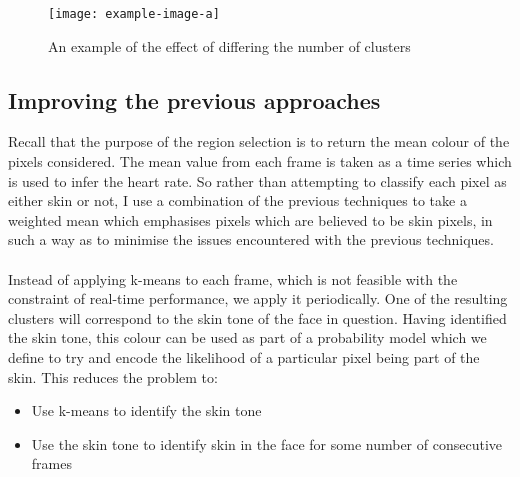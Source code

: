 \begin{figure}[H]
    \texttt{[image: example-image-a]}
   \caption{An example of the effect of differing the number of clusters} 
\end{figure}


\subsection{Improving the previous approaches}
Recall that the purpose of the region selection is to return the mean colour of the pixels considered. The mean value from each frame is taken as a time series which is used to infer the heart rate. So rather than attempting to classify each pixel as either skin or not, I use a combination of the previous techniques to take a weighted mean which emphasises pixels which are believed to be skin pixels, in such a way as to minimise the issues encountered with the previous techniques.
\\ \\
Instead of applying k-means to each frame, which is not feasible with the constraint of real-time performance, we apply it periodically. One of the resulting clusters will correspond to the skin tone of the face in question.
Having identified the skin tone, this colour can be used as part of a probability model which we define to try and encode the likelihood of a particular pixel being part of the skin. This reduces the problem to: 
\begin{itemize}
   \item Use k-means to identify the skin tone
   \item Use the skin tone to identify skin in the face for some number of consecutive frames 
\end{itemize}
